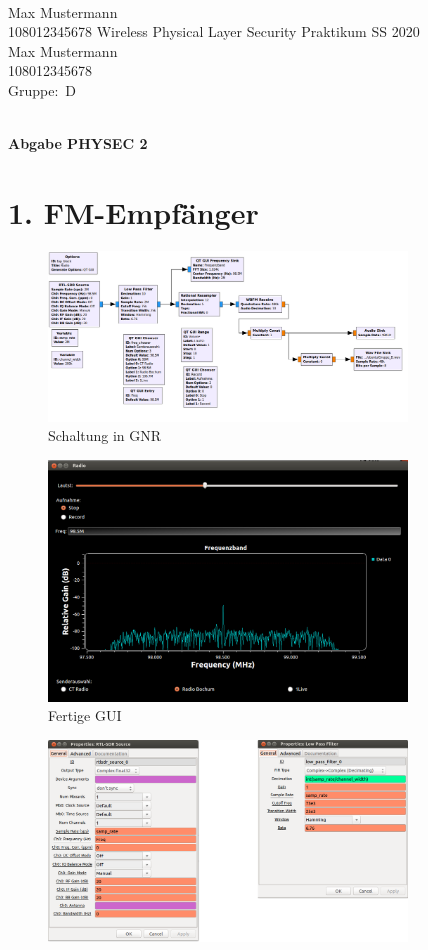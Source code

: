 \documentclass[12pt,a4paper]{article}
\newcommand{\student}{Max Mustermann\\ 108012345678 } %
\newcommand{\partner}{Max Mustermann\\ 108012345678} %
\newcommand{\thirdone}{Max Mustermann\\ 108012345678}
\newcommand{\group}{D} %
\newcommand{\hwheadtwo}{$ $
  \vspace{-2cm}
  
\noindent \student \qquad \qquad  Wireless Physical Layer Security Praktikum \hfill SS 2020 \\
\noindent \partner \\
\noindent Gruppe:~\group\\
$ $

  
\begin{center}    
{\Large \bf Abgabe PHYSEC 2}
\end{center}
}
\begin{document}
\hwheadtwo

\section{1. FM-Empfänger}



 
\begin{figure}[hbt!]
\centering
	\includegraphics[width=0.85\textwidth ]{Bilder/Aufgabe1-gesamt-grc.png}
	\caption{Schaltung in GNR}
	\label{fig:Label1}
\end{figure}



\begin{figure}[hbt!]
\centering
	\includegraphics[width=0.85\textwidth ]{Bilder/Aufgabe1-gui.png}
	\caption{Fertige GUI}
	\label{fig:Label2}
\end{figure}


\begin{figure}[hbt!]
\centering
	\includegraphics[width=0.85\textwidth ]{Bilder/Aufgabe1-properties1.png}
\end{figure}
\end{document}
